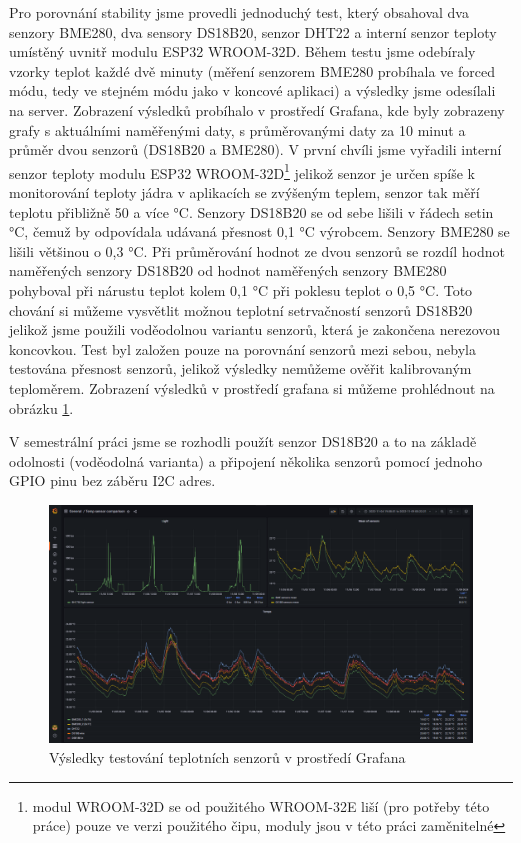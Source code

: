 \par Pro porovnání stability jsme provedli jednoduchý test, který obsahoval dva senzory BME280, dva sensory DS18B20, senzor DHT22 a interní senzor teploty umístěný uvnitř modulu ESP32 WROOM-32D. Během testu jsme odebíraly vzorky teplot každé dvě minuty (měření senzorem BME280 probíhala ve forced módu, tedy ve stejném módu jako v koncové aplikaci) a výsledky jsme odesílali na server. Zobrazení výsledků probíhalo v prostředí Grafana, kde byly zobrazeny grafy s aktuálními naměřenými daty, s průměrovanými daty za 10 minut a průměr dvou senzorů (DS18B20 a BME280). V první chvíli jsme vyřadili interní senzor teploty modulu ESP32 WROOM-32D\footnote{modul WROOM-32D se od použitého WROOM-32E liší (pro potřeby této práce) pouze ve verzi použitého čipu, moduly jsou v této práci zaměnitelné} jelikož senzor je určen spíše k monitorování teploty jádra v aplikacích se zvýšeným teplem, senzor tak měří teplotu přibližně 50 a více °C. Senzory DS18B20 se od sebe lišili v řádech setin °C, čemuž by odpovídala udávaná přesnost 0,1 °C výrobcem. Senzory BME280 se lišili většinou o 0,3 °C. Při průměrování hodnot ze dvou senzorů se rozdíl hodnot naměřených senzory DS18B20 od hodnot naměřených senzory BME280 pohyboval při nárustu teplot kolem 0,1 °C při poklesu teplot o 0,5 °C. Toto chování si můžeme vysvětlit možnou teplotní setrvačností senzorů DS18B20 jelikož jsme použili voděodolnou variantu senzorů, která je zakončena nerezovou koncovkou. Test byl založen pouze na porovnání senzorů mezi sebou, nebyla testována přesnost senzorů, jelikož výsledky nemůžeme ověřit kalibrovaným teploměrem. Zobrazení výsledků v prostředí grafana si můžeme prohlédnout na obrázku \ref{obr:Grafana}.
\par V semestrální práci jsme se rozhodli použít senzor DS18B20 a to na základě odolnosti (voděodolná varianta) a připojení několika senzorů pomocí jednoho GPIO pinu bez záběru I2C adres.

    \begin{figure}[!h]
      \begin{center}
        \includegraphics[scale=0.3]{obrazky/prace/Grafana_TempSensor_Coparison_Test.png}
      \end{center}
      \caption[Výsledky testování teplotních senzorů]{Výsledky testování teplotních senzorů v prostředí Grafana}
      \label{obr:Grafana}
    \end{figure}

